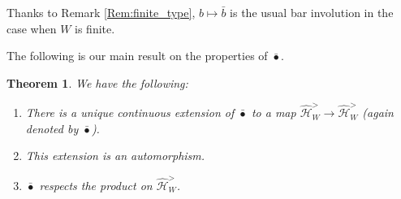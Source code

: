 \documentclass{amsart}
\newcommand{\Hecke}{\mathcal{H}}
\newtheorem{Thm}{Theorem}[section]
\theoremstyle{definition}
\numberwithin{equation}{section}
\begin{document}
Thanks to Remark \ref{Rem:finite_type}, $b\mapsto\bar{b}$ is the usual bar involution in the case when $W$ is finite.

The following is our main result on the properties of $\bar{\bullet}$.

\begin{Thm}\label{Thm:bar_Tits_properties}
We have the following:
\begin{enumerate}
\item There is a unique continuous extension of $\bar{\bullet}$ to a map $ \widehat{\Hecke}_W^{>}
\rightarrow \widehat{\Hecke}_W^{>}$ (again denoted by $\bar{\bullet}$).
\item 
This extension is an automorphism.
\item $\bar{\bullet}$ respects the product on
$\widehat{\Hecke}_W^{>}$.\end{enumerate}
\end{Thm}
\end{document}
